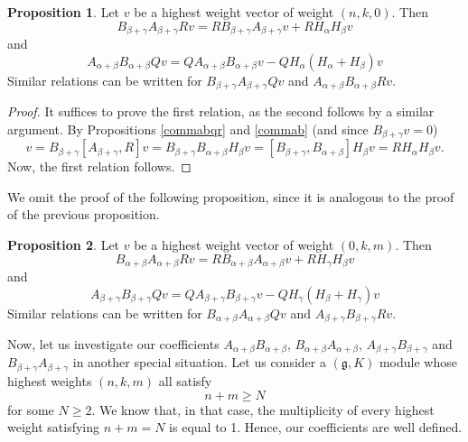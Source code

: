 \documentclass[twoside,a4paper,12pt]{article}
\newcommand{\g}{\ensuremath{\mathfrak g}}
\theoremstyle{definition}
\newtheorem{proposition}{Proposition}
\begin{document}
\begin{proposition}\label{abbcmnul}
	Let $v$ be a highest weight vector of weight $(n,k,0)$. Then
	\begin{equation*}
		B_{\beta+\gamma}A_{\beta+\gamma}Rv=
		RB_{\beta+\gamma}A_{\beta+\gamma}v+RH_\alpha H_\beta v
	\end{equation*}
	and
	\begin{equation*}
		A_{\alpha+\beta}B_{\alpha+\beta}Qv=
		QA_{\alpha+\beta}B_{\alpha+\beta}v-QH_\alpha(H_\alpha+H_\beta) v
	\end{equation*}
	Similar relations can be written for $B_{\beta+\gamma}A_{\beta+\gamma}Qv$
	and $A_{\alpha+\beta}B_{\alpha+\beta}Rv$.
\end{proposition}

\begin{proof}
	It suffices to prove the first relation, as the second follows by a similar
	argument. By Propositions \ref{commabqr} and \ref{commab}
	(and since $B_{\beta+\gamma}v=0$)
	\begin{equation*}
		[B_{\beta+\gamma}A_{\beta+\gamma},R]v=
		B_{\beta+\gamma}[A_{\beta+\gamma},R]v=
		B_{\beta+\gamma}B_{\alpha+\beta}H_\beta v=
		[B_{\beta+\gamma},B_{\alpha+\beta}]H_\beta v=
		RH_\alpha H_\beta v.
	\end{equation*}
	Now, the first relation follows.
\end{proof}

We omit the proof of the following proposition, since it is analogous to the
proof of the previous proposition.

\begin{proposition}\label{abbcnnul}
	Let $v$ be a highest weight vector of weight $(0,k,m)$. Then
	\begin{equation*}
		B_{\alpha+\beta}A_{\alpha+\beta}Rv=
		RB_{\alpha+\beta}A_{\alpha+\beta}v+RH_\gamma H_\beta v
	\end{equation*}
	and
	\begin{equation*}
		A_{\beta+\gamma}B_{\beta+\gamma}Qv=
		QA_{\beta+\gamma}B_{\beta+\gamma}v-QH_\gamma(H_\beta+H_\gamma) v
	\end{equation*}
	Similar relations can be written for $B_{\alpha+\beta}A_{\alpha+\beta}Qv$
	and $A_{\beta+\gamma}B_{\beta+\gamma}Rv$.
\end{proposition}

Now, let us investigate our coefficients $A_{\alpha+\beta}B_{\alpha+\beta}$,
$B_{\alpha+\beta}A_{\alpha+\beta}$, $A_{\beta+\gamma}B_{\beta+\gamma}$ and
$B_{\beta+\gamma}A_{\beta+\gamma}$ in another special situation.
Let us consider a $(\g,K)$ module whose highest weights $(n,k,m)$ all satisfy
\begin{equation}\label{bign}
	n+m\geq N
\end{equation}
for some $N\geq2$. We know that, in that case, the multiplicity of
every highest weight satisfying $n+m=N$ is equal to 1. Hence, our coefficients
are well defined.
\end{document}
